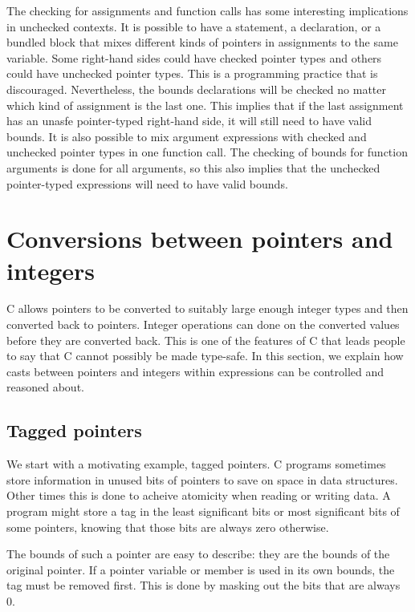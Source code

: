 The checking for assignments and function calls has some interesting 
implications in unchecked contexts.  It is possible to have a statement, 
a declaration, or a bundled block that mixes different kinds of pointers
in assignments to the same  variable.  
Some right-hand sides could have checked pointer types and others
could have unchecked pointer types.  This is a programming practice that is discouraged.
Nevertheless, the bounds declarations will be checked no matter which
kind of assignment is the last one.  This implies that if the last 
assignment has an unasfe pointer-typed right-hand side, it will still need
to have valid bounds.   It is also possible to mix argument expressions with 
checked and unchecked  pointer types in one function call.  The checking of bounds
for function arguments is done for all arguments, so this also implies that the unchecked
pointer-typed expressions will need to have valid bounds.


\section{Conversions between pointers and integers}
\label{section:pointer-integer-conversions}

C allows pointers to be converted to suitably large enough integer
types and then converted back to pointers.  Integer operations can
done on the converted values before they are converted back.
This is one of the features of C that leads people to 
say that C cannot possibly be made type-safe.  In this section,
we explain how casts between pointers and integers within 
expressions can be controlled and reasoned about.

\subsection{Tagged pointers}
We start with a motivating example, tagged pointers.
C programs sometimes store information in unused bits of pointers
to save on space in data structures.  Other times this is done
to acheive atomicity when reading or writing data.  A
program might store a tag in the least significant bits or most
significant bits of some pointers, knowing that those bits are always
zero otherwise.

The bounds of such a pointer are easy to describe: they are the bounds
of the original pointer. If a pointer variable or member is used in its
own bounds, the tag must be removed first. This is
done by masking out the bits that are always 0.

